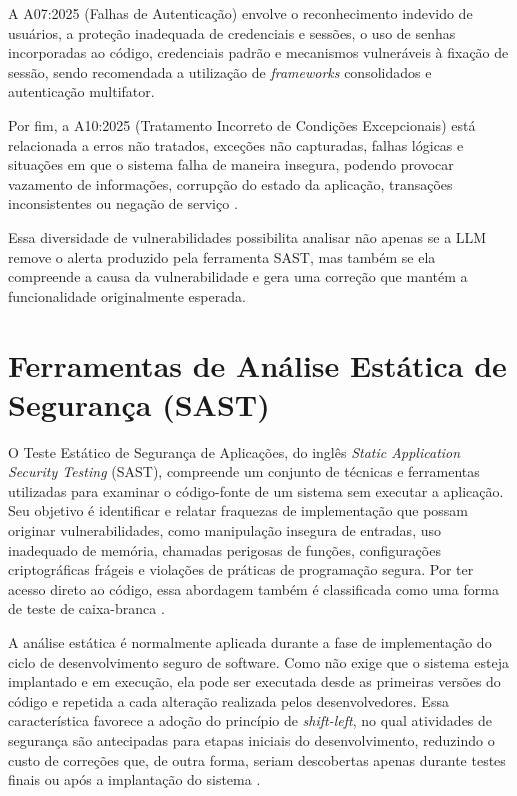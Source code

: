 A A07:2025 (Falhas de Autenticação) envolve o reconhecimento indevido de usuários, a proteção inadequada de credenciais e sessões, o uso de senhas incorporadas ao código, credenciais padrão e mecanismos vulneráveis à fixação de sessão, sendo recomendada a utilização de \textit{frameworks} consolidados e autenticação multifator. 

Por fim, a A10:2025 (Tratamento Incorreto de Condições Excepcionais) está relacionada a erros não tratados, exceções não capturadas, falhas lógicas e situações em que o sistema falha de maneira insegura, podendo provocar vazamento de informações, corrupção do estado da aplicação, transações inconsistentes ou negação de serviço \cite{owasp_top10_2025_intro}.

Essa diversidade de vulnerabilidades possibilita analisar não apenas se a LLM remove o alerta produzido pela ferramenta SAST, mas também se ela compreende a causa da vulnerabilidade e gera uma correção que mantém a funcionalidade originalmente esperada.

\section{Ferramentas de Análise Estática de Segurança (SAST)}

O Teste Estático de Segurança de Aplicações, do inglês \textit{Static Application Security Testing} (SAST), compreende um conjunto de técnicas e ferramentas utilizadas para examinar o código-fonte de um sistema sem executar a aplicação. Seu objetivo é identificar e relatar fraquezas de implementação que possam originar vulnerabilidades, como manipulação insegura de entradas, uso inadequado de memória, chamadas perigosas de funções, configurações criptográficas frágeis e violações de práticas de programação segura. Por ter acesso direto ao código, essa abordagem também é classificada como uma forma de teste de caixa-branca \cite{noauthor_static_nodate,nist_source_code_security_analyzers_2021}.

A análise estática é normalmente aplicada durante a fase de implementação do ciclo de desenvolvimento seguro de software. Como não exige que o sistema esteja implantado e em execução, ela pode ser executada desde as primeiras versões do código e repetida a cada alteração realizada pelos desenvolvedores. Essa característica favorece a adoção do princípio de \textit{shift-left}, no qual atividades de segurança são antecipadas para etapas iniciais do desenvolvimento, reduzindo o custo de correções que, de outra forma, seriam descobertas apenas durante testes finais ou após a implantação do sistema \cite{noauthor_static_nodate}.

